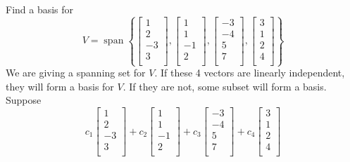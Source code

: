 \documentclass{article}
\DeclareMathOperator{\spn}{span}
\begin{document}
  \begin{example}
    Find a basis for
    \[
      V = \spn \left\{
        \begin{bmatrix}
          1\\2\\-3\\3\\
        \end{bmatrix},
        \begin{bmatrix}
          1\\1\\-1\\2\\
        \end{bmatrix},
        \begin{bmatrix}
          -3\\-4\\5\\7\\
        \end{bmatrix},
        \begin{bmatrix}
          3\\1\\2\\4\\
      \end{bmatrix}\right\}
    \]
    We are giving a spanning set for $V$. If these 4 vectors are linearly independent, they will form a basis for $V$. If they are not, some subset will form a basis.
    Suppose \[
      c_1
      \begin{bmatrix}
        1\\2\\-3\\3\\
      \end{bmatrix} +c_2
      \begin{bmatrix}
        1\\1\\-1\\2\\
      \end{bmatrix} +c_3
      \begin{bmatrix}
        -3\\-4\\5\\7\\
      \end{bmatrix} +c_4
      \begin{bmatrix}
        3\\1\\2\\4\\

\end{bmatrix}\]
\end{example}
\end{document}
